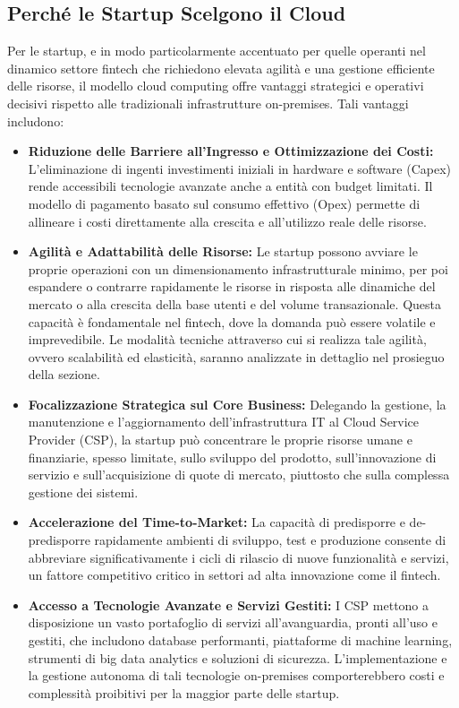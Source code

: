 \subsection{Perché le Startup Scelgono il Cloud}
\label{sec:startup-cloud-choice}

Per le startup, e in modo particolarmente accentuato per quelle operanti nel dinamico settore fintech che richiedono elevata agilità e una gestione efficiente delle risorse, il modello cloud computing offre vantaggi strategici e operativi decisivi rispetto alle tradizionali infrastrutture on-premises. Tali vantaggi includono:

\begin{itemize}
\item \textbf{Riduzione delle Barriere all'Ingresso e Ottimizzazione dei Costi:} L'eliminazione di ingenti investimenti iniziali in hardware e software (Capex) rende accessibili tecnologie avanzate anche a entità con budget limitati. Il modello di pagamento basato sul consumo effettivo (Opex) permette di allineare i costi direttamente alla crescita e all'utilizzo reale delle risorse.
\item \textbf{Agilità e Adattabilità delle Risorse:} Le startup possono avviare le proprie operazioni con un dimensionamento infrastrutturale minimo, per poi espandere o contrarre rapidamente le risorse in risposta alle dinamiche del mercato o alla crescita della base utenti e del volume transazionale. Questa capacità è fondamentale nel fintech, dove la domanda può essere volatile e imprevedibile. Le modalità tecniche attraverso cui si realizza tale agilità, ovvero scalabilità ed elasticità, saranno analizzate in dettaglio nel prosieguo della sezione.
\item \textbf{Focalizzazione Strategica sul Core Business:} Delegando la gestione, la manutenzione e l'aggiornamento dell'infrastruttura IT al Cloud Service Provider (CSP), la startup può concentrare le proprie risorse umane e finanziarie, spesso limitate, sullo sviluppo del prodotto, sull'innovazione di servizio e sull'acquisizione di quote di mercato, piuttosto che sulla complessa gestione dei sistemi.
\item \textbf{Accelerazione del Time-to-Market:} La capacità di predisporre e de-predisporre rapidamente ambienti di sviluppo, test e produzione consente di abbreviare significativamente i cicli di rilascio di nuove funzionalità e servizi, un fattore competitivo critico in settori ad alta innovazione come il fintech.
\item \textbf{Accesso a Tecnologie Avanzate e Servizi Gestiti:} I CSP mettono a disposizione un vasto portafoglio di servizi all'avanguardia, pronti all'uso e gestiti, che includono database performanti, piattaforme di machine learning, strumenti di big data analytics e soluzioni di sicurezza. L'implementazione e la gestione autonoma di tali tecnologie on-premises comporterebbero costi e complessità proibitivi per la maggior parte delle startup.

\end{itemize}
